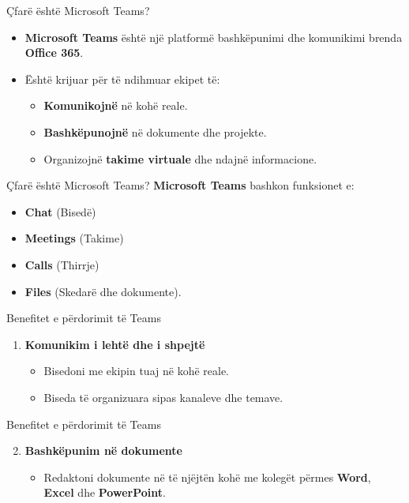 \documentclass[
  ignorenonframetext,
]{beamer}
\providecommand{\tightlist}{%
  \setlength{\itemsep}{0pt}\setlength{\parskip}{0pt}}
\begin{document}
\begin{frame}{Çfarë është Microsoft Teams?}
\label{uxe7faruxeb-uxebshtuxeb-microsoft-teams}
\begin{itemize}
\item
  \textbf{Microsoft Teams} është një platformë bashkëpunimi dhe
  komunikimi brenda \textbf{Office 365}.
\item
  Është krijuar për të ndihmuar ekipet të:

  \begin{itemize}
  \item
    \textbf{Komunikojnë} në kohë reale.
  \item
    \textbf{Bashkëpunojnë} në dokumente dhe projekte.
  \item
    Organizojnë \textbf{takime virtuale} dhe ndajnë informacione.
  \end{itemize}
\end{itemize}
\end{frame}

\begin{frame}{Çfarë është Microsoft Teams?}
\label{uxe7faruxeb-uxebshtuxeb-microsoft-teams-1}
\textbf{Microsoft Teams} bashkon funksionet e:

\begin{itemize}
\item
  \textbf{Chat} (Bisedë)
\item
  \textbf{Meetings} (Takime)
\item
  \textbf{Calls} (Thirrje)
\item
  \textbf{Files} (Skedarë dhe dokumente).
\end{itemize}
\end{frame}

\begin{frame}{Benefitet e përdorimit të Teams}
\label{benefitet-e-puxebrdorimit-tuxeb-teams}
\begin{enumerate}
\item
  \textbf{Komunikim i lehtë dhe i shpejtë}

  \begin{itemize}
  \item
    Bisedoni me ekipin tuaj në kohë reale.
  \item
    Biseda të organizuara sipas kanaleve dhe temave.
  \end{itemize}
\end{enumerate}
\end{frame}

\begin{frame}{Benefitet e përdorimit të Teams}
\label{benefitet-e-puxebrdorimit-tuxeb-teams-1}
\begin{enumerate}
\setcounter{enumi}{1}
\item
  \textbf{Bashkëpunim në dokumente}

  \begin{itemize}
  \tightlist
  \item
    Redaktoni dokumente në të njëjtën kohë me kolegët përmes
    \textbf{Word}, \textbf{Excel} dhe \textbf{PowerPoint}.
  \end{itemize}
\end{enumerate}
\end{frame}
\end{document}
